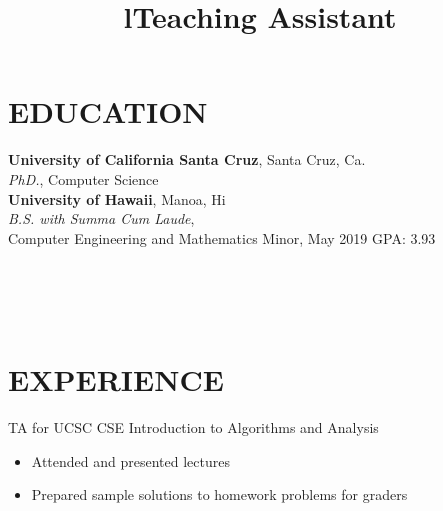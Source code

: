 \documentclass[margin]{res}
\begin{document}


\address{Cell: (808)286-0540}
\address{Email: charlieadickens@gmail.com}


\begin{resume}

\section{EDUCATION}
\textbf{University of California Santa Cruz}, Santa Cruz, Ca.\\
{\sl PhD.}, Computer Science
\\
\textbf{University of Hawaii}, Manoa, Hi\\
{\sl B.S. with Summa Cum Laude}, \\ 
Computer Engineering and Mathematics Minor, May 2019
\hfill GPA: 
3.93


\begin{format}
\title{l}\\
\\
\body\\
\end{format}

\section{EXPERIENCE}
\title{\textbf{Teaching Assistant}}
\begin{position}
TA for UCSC CSE Introduction to Algorithms and Analysis
\begin{itemize}
\item Attended and presented lectures
\item Prepared sample solutions to homework problems for graders
\end{itemize}
\end{position}


\end{resume}
\end{document}

